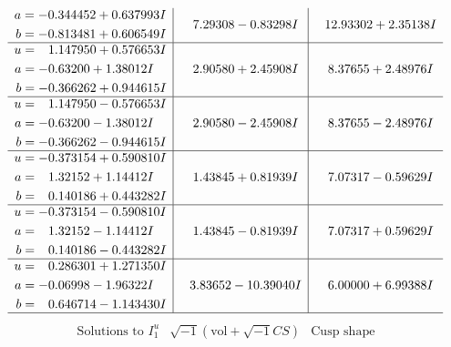 \documentclass[1p]{elsarticle_modified}
\theoremstyle{definition}
\newcommand{\I}{\sqrt{-1}}
\begin{document}
$$\begin{array}{c|c|c}
\begin{aligned}
a &= -0.344452 + 0.637993 I \\
b &= -0.813481 + 0.606549 I\end{aligned}
 & \phantom{-}7.29308 - 0.83298 I & \phantom{-}12.93302 + 2.35138 I \\ \hline\begin{aligned}
u &= \phantom{-}1.147950 + 0.576653 I \\
a &= -0.63200 + 1.38012 I \\
b &= -0.366262 + 0.944615 I\end{aligned}
 & \phantom{-}2.90580 + 2.45908 I & \phantom{-}8.37655 + 2.48976 I \\ \hline\begin{aligned}
u &= \phantom{-}1.147950 - 0.576653 I \\
a &= -0.63200 - 1.38012 I \\
b &= -0.366262 - 0.944615 I\end{aligned}
 & \phantom{-}2.90580 - 2.45908 I & \phantom{-}8.37655 - 2.48976 I \\ \hline\begin{aligned}
u &= -0.373154 + 0.590810 I \\
a &= \phantom{-}1.32152 + 1.14412 I \\
b &= \phantom{-}0.140186 + 0.443282 I\end{aligned}
 & \phantom{-}1.43845 + 0.81939 I & \phantom{-}7.07317 - 0.59629 I \\ \hline\begin{aligned}
u &= -0.373154 - 0.590810 I \\
a &= \phantom{-}1.32152 - 1.14412 I \\
b &= \phantom{-}0.140186 - 0.443282 I\end{aligned}
 & \phantom{-}1.43845 - 0.81939 I & \phantom{-}7.07317 + 0.59629 I \\ \hline\begin{aligned}
u &= \phantom{-}0.286301 + 1.271350 I \\
a &= -0.06998 - 1.96322 I \\
b &= \phantom{-}0.646714 - 1.143430 I\end{aligned}
 & \phantom{-}3.83652 - 10.39040 I & \phantom{-}6.00000 + 6.99388 I\\
 \hline 
 \end{array}$$\newpage$$\begin{array}{c|c|c}  
\text{Solutions to }I^u_{1}& \I (\text{vol} + \sqrt{-1}CS) & \text{Cusp shape}\\
 \hline 
\begin{aligned}

\end{aligned}
\end{array}$$
\end{document}
